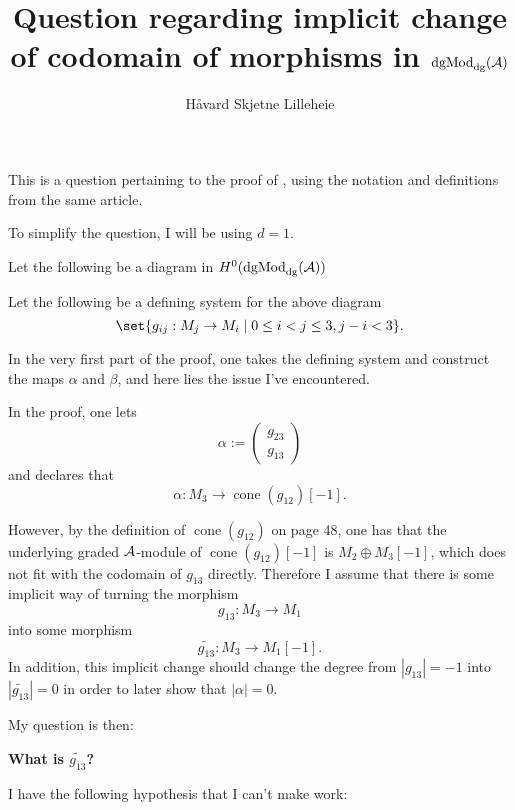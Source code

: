 \documentclass[a4paper, 12pt]{article}
\title{Question regarding implicit change of codomain of morphisms in \( \operatorname{dgMod}_{\operatorname{dg}}({\mathcal{A}}) \)}
\author{Håvard Skjetne Lilleheie}
\DeclareMathOperator{\cone}{cone}
\begin{document}
\maketitle

This is a question pertaining to the proof of \cite[Proposition 4.2.8]{Jasso-Muro_2023}, using the notation and definitions from the same article.

To simplify the question, I will be using \( d = 1 \).

Let the following be a diagram in \( H^0(\operatorname{dgMod}_{\operatorname{dg}}({\mathcal{A}})) \)
\begin{center}
\end{center}

Let the following be a defining system for the above diagram
\[
    \set{g_{ij}: M_j \to M_i \mid 0 \leq i < j \leq 3, j - i < 3}.
\]

In the very first part of the proof, one takes the defining system and construct the maps \( \alpha \) and \( \beta \), and here lies the issue I've encountered.

In the proof, one lets
\[
    \alpha :=
    \begin{pmatrix}
        g_{23} \\
        g_{13}
    \end{pmatrix}
\]
and declares that
\[
    \alpha: M_3 \to \cone(g_{12})[-1].
\]

However, by the definition of \( \cone(g_{12}) \) on page 48, one has that the underlying graded \( {\mathcal{A}} \)-module of \( \cone(g_{12})[-1] \) is \( M_2 \oplus M_3[-1] \), which does not fit with the codomain of \( g_{13} \) directly. Therefore I assume that there is some implicit way of turning the morphism
\[
    g_{13}: M_3 \to M_1
\]
into some morphism
\[
    \widetilde{g_{13}}: M_3 \to M_1[-1].
\]
In addition, this implicit change should change the degree from \( |g_{13}| = -1 \) into \( |\widetilde{g_{13}}| = 0 \) in order to later show that \( |\alpha| = 0 \).

My question is then:
\begin{center}
    \textbf{What is \( \widetilde{g_{13}} \)?}
\end{center}
I have the following hypothesis that I can't make work:
\end{document}
